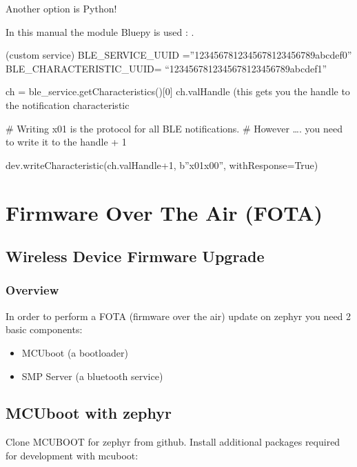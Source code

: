 \documentclass[letterpaper,10pt,english]{sphinxmanual}
\begin{document}
Another option is Python!

In this manual the module Bluepy is used : .

(custom service)
BLE\_SERVICE\_UUID =”12345678\sphinxhyphen{}1234\sphinxhyphen{}5678\sphinxhyphen{}1234\sphinxhyphen{}56789abcdef0”
BLE\_CHARACTERISTIC\_UUID= “12345678\sphinxhyphen{}1234\sphinxhyphen{}5678\sphinxhyphen{}1234\sphinxhyphen{}56789abcdef1”

ch = ble\_service.getCharacteristics(){[}0{]}
ch.valHandle (this gets you the handle to the notification characteristic

\# Writing x01 is the protocol for all BLE notifications.
\# However …. you need to write it to the handle + 1

dev.writeCharacteristic(ch.valHandle+1, b”x01x00”, withResponse=True)


\chapter{Firmware Over The Air (FOTA)}
\label{\detokenize{fota/fota:firmware-over-the-air-fota}}\label{\detokenize{fota/fota:fota}}\label{\detokenize{fota/fota::doc}}

\section{Wireless Device Firmware Upgrade}
\label{\detokenize{fota/mcuboot:wireless-device-firmware-upgrade}}\label{\detokenize{fota/mcuboot:mcuboot}}\label{\detokenize{fota/mcuboot::doc}}

\subsection{Overview}
\label{\detokenize{fota/mcuboot:overview}}
In order to perform a FOTA (firmware over the air) update on zephyr you need 2 basic components:
\begin{itemize}
\item {} 
MCUboot   (a bootloader)

\item {} 
SMP Server (a bluetooth service)

\end{itemize}


\section{MCUboot with zephyr}
\label{\detokenize{fota/mcuboot:mcuboot-with-zephyr}}\label{\detokenize{fota/mcuboot:id1}}
Clone MCUBOOT for zephyr from github.
Install additional packages required for development with mcuboot:
\end{document}
